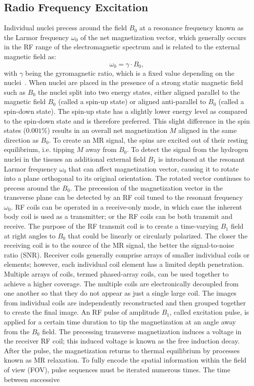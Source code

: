 \documentclass[english,version-2022-01]{uzl-thesis} %
\begin{document}
\subsection{Radio Frequency Excitation}
Individual nuclei precess around the field $B_0$ at a
resonance frequency known as the Larmor frequency $\omega_0$ of the net magnetization vector, which generally occurs in the RF range of the electromagnetic spectrum and is related to the external magnetic field as:
\begin{equation} \label{eq:LarmorFrequency}
	\omega_0 = \gamma \cdot B_0,
\end{equation}
with $\gamma$ being the gyromagnetic ratio, which is a fixed value depending on the nuclei~\cite{SamplingStrategies}. When nuclei are placed in the presence of a strong static magnetic field such as $B_0$ the nuclei split into two energy states, either aligned parallel to the magnetic field $B_0$ (called a spin-up state) or aligned anti-parallel to $B_0$ (called a spin-down state). The spin-up state has a slightly lower energy level as compared to the spin-down state and is therefore preferred. This slight difference in the spin states ($0.001\%$) results in an overall net magnetization $M$ aligned in the same direction as $B_0$. To create an MR signal, the spins are excited out of their resting equilibrium, i.e. tipping $M$ away from $B_0$. To detect the signal from the hydrogen nuclei in the tissues an additional external field $B_1$ is introduced at the resonant Larmor frequency $\omega_0$ that can affect magnetization vector, causing it to rotate into a plane orthogonal to its original orientation. The rotated vector continues to precess around the $B_0$. The precession of the magnetization vector in the transverse plane can be detected by an RF coil tuned to the resonant frequency $\omega_0$. RF coils can be operated in a receive-only mode, in which case the inherent body coil is used as a transmitter; or the RF coils can be both transmit and receive. The purpose of the RF transmit coil is to create a time-varying $B_1$ field at right angles to $B_0$ that could be linearly or circularly polarized. The closer the receiving coil is to the source of the MR signal, the better the signal-to-noise ratio (SNR). Receiver coils generally comprise arrays of smaller individual coils or elements; however, each individual coil element has a limited depth penetration. Multiple arrays of coils, termed phased-array coils, can be used together to achieve a higher coverage. The multiple coils are electronically decoupled from one another so that they do not appear as just a single large coil. The images from individual coils are independently reconstructed and then grouped together to create the final image. An RF pulse of amplitude $B_1$, called excitation pulse, is applied for a certain time duration to tip the magnetization at an angle away from the $B_0$ field. The precessing transverse magnetization induces a voltage in the receiver RF coil; this induced voltage is known as the free induction decay. After the pulse, the magnetization returns to thermal equilibrium by processes known as MR relaxation. To fully encode the spatial information within the field of view (FOV), pulse sequences must be iterated numerous times. The time between successive 
\end{document}
